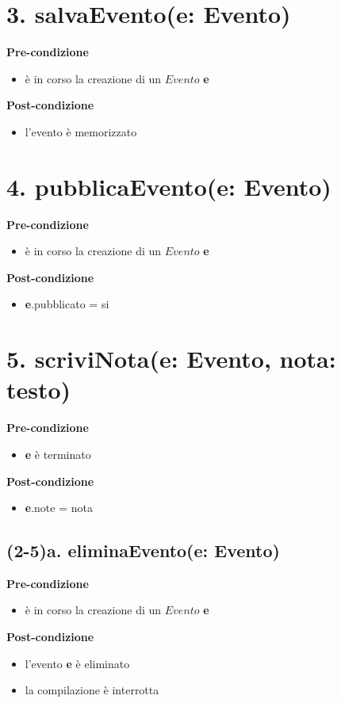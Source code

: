 \documentclass[12pt]{extarticle}
\begin{document}
\section*{3. salvaEvento(e: Evento)}
\textbf{Pre-condizione}
\begin{itemize}
  \item è in corso la creazione di un $Evento$ \textbf{e}
\end{itemize}
\textbf{Post-condizione}
\begin{itemize}
    \item l'evento è memorizzato
\end{itemize}


\section*{4. pubblicaEvento(e: Evento)}
\textbf{Pre-condizione}
\begin{itemize}
  \item è in corso la creazione di un $Evento$ \textbf{e}
\end{itemize}
\textbf{Post-condizione}
\begin{itemize}
    \item \textbf{e}.pubblicato = si
\end{itemize}

\section*{5. scriviNota(e: Evento, nota: testo)}

\textbf{Pre-condizione}
\begin{itemize}
  \item \textbf{e} è terminato
\end{itemize}
\textbf{Post-condizione}
\begin{itemize}
  \item \textbf{e}.note = nota
\end{itemize}


\subsection*{(2-5)a. eliminaEvento(e: Evento)}

\textbf{Pre-condizione}
\begin{itemize}
  \item è in corso la creazione di un $Evento$ \textbf{e}
\end{itemize}
\textbf{Post-condizione}
\begin{itemize}
  \item l'evento \textbf{e} è eliminato
  \item la compilazione è interrotta
\end{itemize}  
\end{document}
